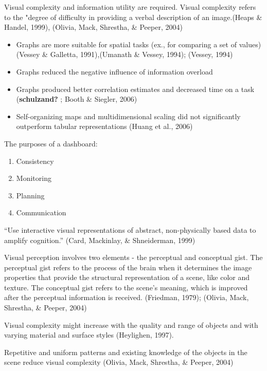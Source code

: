 \documentclass[print]{nuthesis}
\providecommand{\tightlist}{%
  \setlength{\itemsep}{0pt}\setlength{\parskip}{0pt}}
\begin{document}
Visual complexity and information utility are required. Visual complexity refers to the "degree of difficulty in providing a verbal description of an image.(Heaps \& Handel, 1999), (Olivia, Mack, Shrestha, \& Peeper, 2004)

\begin{itemize}
\tightlist
\item
  Graphs are more suitable for spatial tasks (ex., for comparing a set of values) (Vessey \& Galletta, 1991),(Umanath \& Vessey, 1994); (Vessey, 1994)
\item
  Graphs reduced the negative influence of information overload
\item
  Graphs produced better correlation estimates and decreased time on a task (\textbf{schulzand?} ; Booth \& Siegler, 2006)
\item
  Self-organizing maps and multidimensional scaling did not significantly outperform tabular representations (Huang et al., 2006)
\end{itemize}

The purposes of a dashboard:

\begin{enumerate}
\def\labelenumi{\arabic{enumi}.}
\tightlist
\item
  Consistency
\item
  Monitoring
\item
  Planning
\item
  Communication
\end{enumerate}

``Use interactive visual representations of abstract, non-physically based data to amplify cognition.'' (Card, Mackinlay, \& Shneiderman, 1999)

Visual perception involves two elements - the perceptual and conceptual gist. The perceptual gist refers to the process of the brain when it determines the image properties that provide the structural representation of a scene, like color and texture. The conceptual gist refers to the scene's meaning, which is improved after the perceptual information is received. (Friedman, 1979); (Olivia, Mack, Shrestha, \& Peeper, 2004)

Visual complexity might increase with the quality and range of objects and with varying material and surface styles (Heylighen, 1997).

Repetitive and uniform patterns and existing knowledge of the objects in the scene reduce visual complexity (Olivia, Mack, Shrestha, \& Peeper, 2004)
\end{document}
